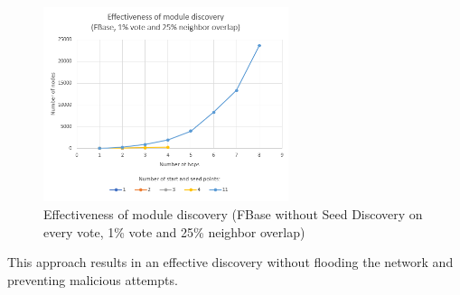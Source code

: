 \begin{figure}[ht!]
	\centering
	\includegraphics[width=0.64\textwidth]{images/discovery-fbase-extented-25.png}
	\caption{\label{fig:discovery-fbase-extended-25} Effectiveness of module discovery (FBase without Seed Discovery on every vote, 1\% vote and 25\% neighbor overlap)}
\end{figure}


This approach results in an effective discovery without flooding the network and preventing malicious attempts.

